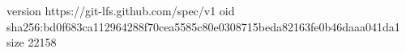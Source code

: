 version https://git-lfs.github.com/spec/v1
oid sha256:bd0f683ca112964288f70cea5585c80e0308715beda82163fe0b46daaa041da1
size 22158
